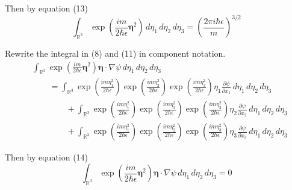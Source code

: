 \documentclass[12pt]{article}
\begin{document}
Then by equation (13)
\begin{equation*}
\int_{\mathbb R^3}
\exp\left(\frac{im}{2\hbar\epsilon}\boldsymbol\eta^2\right)
\,d\eta_1\,d\eta_2\,d\eta_3
=\left(\frac{2\pi i\hbar\epsilon}{m}\right)^{3/2}
\tag{16}
\end{equation*}

Rewrite the integral in (8) and (11) in component notation.
\begin{align*}
&\int_{\mathbb R^3}
\exp\left(\frac{im}{2\hbar\epsilon}\boldsymbol\eta^2\right)
\boldsymbol\eta\cdot\nabla\psi
\,d\eta_1\,d\eta_2\,d\eta_3
\\
&\qquad{}=
\int_{\mathbb R^3}
\exp\left(\frac{im\eta_1^2}{2\hbar\epsilon}\right)
\exp\left(\frac{im\eta_2^2}{2\hbar\epsilon}\right)
\exp\left(\frac{im\eta_3^2}{2\hbar\epsilon}\right)
\eta_1\frac{\partial\psi}{\partial x_1}
\,d\eta_1\,d\eta_2\,d\eta_3
\\
&\qquad\qquad{}+\int_{\mathbb R^3}
\exp\left(\frac{im\eta_1^2}{2\hbar\epsilon}\right)
\exp\left(\frac{im\eta_2^2}{2\hbar\epsilon}\right)
\exp\left(\frac{im\eta_3^2}{2\hbar\epsilon}\right)
\eta_2\frac{\partial\psi}{\partial x_2}
\,d\eta_1\,d\eta_2\,d\eta_3
\\
&\qquad\qquad{}+\int_{\mathbb R^3}
\exp\left(\frac{im\eta_1^2}{2\hbar\epsilon}\right)
\exp\left(\frac{im\eta_2^2}{2\hbar\epsilon}\right)
\exp\left(\frac{im\eta_3^2}{2\hbar\epsilon}\right)
\eta_3\frac{\partial\psi}{\partial x_3}
\,d\eta_1\,d\eta_2\,d\eta_3
\end{align*}

Then by equation (14)
\begin{equation*}
\int_{\mathbb R^3}
\exp\left(\frac{im}{2\hbar\epsilon}\boldsymbol\eta^2\right)
\boldsymbol\eta\cdot\nabla\psi
\,d\eta_1\,d\eta_2\,d\eta_3=0
\tag{17}
\end{equation*}
\end{document}
